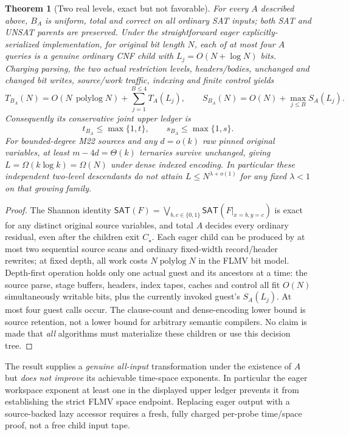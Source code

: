 \documentclass[11pt]{article}
\newtheorem{theorem}{Theorem}
\newcommand{\SAT}{\mathsf{SAT}}
\begin{document}
\begin{theorem}[Two real levels, exact but not favorable]
For every \(A\) described above, \(B_A\) is uniform, total and
correct on all ordinary SAT inputs; both SAT and UNSAT parents are
preserved. Under the straightforward eager explicitly-serialized
implementation, for original bit length \(N\), each of at most four
\(A\) queries is a genuine ordinary CNF child with
\(L_j=O(N+\log N)\) bits. Charging parsing, the two actual
restriction levels, headers/bodies, unchanged and changed bit writes,
source/work traffic, indexing and finite control yields
\[
T_{B_A}(N)=O(N\,\operatorname{polylog}N)+
  \sum_{j=1}^{B\le4}T_A(L_j),\qquad
S_{B_A}(N)=O(N)+\max_{j\le B}S_A(L_j).
\]
Consequently its conservative \emph{joint upper ledger} is
\[
\boxed{\quad t_{B_A}\le\max\{1,t\},\qquad
s_{B_A}\le\max\{1,s\}.\quad}
\]
For bounded-degree M22 sources and any \(d=o(k)\) raw pinned
original variables, at least \(m-4d=\Theta(k)\) ternaries
survive unchanged, giving \(L=\Omega(k\log k)=\Omega(N)\)
under dense indexed encoding. In particular these independent
two-level descendants do not attain \(L\le N^{\lambda+o(1)}\)
for any fixed \(\lambda<1\) on that growing family.
\end{theorem}
\begin{proof}
The Shannon identity
\(\SAT(F)=\bigvee_{b,c\in\{0,1\}}\SAT(F|_{x=b,y=c})\)
is exact for any distinct original source variables,
and total \(A\) decides every ordinary residual, even after
the children exit \(C_\star\). Each eager child can be produced
by at most two sequential source scans and ordinary fixed-width
record/header rewrites; at fixed depth, all work costs
\(N\operatorname{polylog}N\) in the FLMV bit model. Depth-first
operation holds only one actual guest and its ancestors at a time:
the source parse, stage buffers, headers, index tapes, caches and
control all fit \(O(N)\) simultaneously writable bits, plus the
currently invoked guest's \(S_A(L_j)\). At most four
guest calls occur. The clause-count and dense-encoding lower
bound is source retention, not a lower bound for arbitrary
semantic compilers. No claim is made that \emph{all} algorithms
must materialize these children or use this decision tree.
\end{proof}

The result supplies a \emph{genuine all-input} transformation under
the existence of \(A\) but \emph{does not improve} its achievable
time-space exponents. In particular the eager workspace exponent
at least one in the displayed upper ledger prevents it from
establishing the strict FLMV space endpoint. Replacing eager output
with a source-backed lazy accessor requires a fresh, fully charged
per-probe time/space proof, not a free child input tape.
\end{document}
